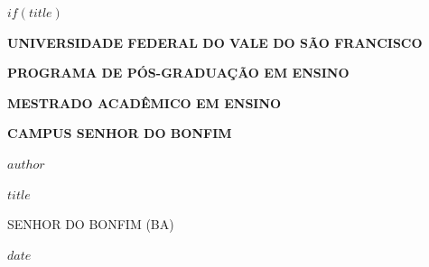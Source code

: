 $if(title)$
\begin{titlepage}
\thispagestyle{empty}
\begin{center}

{\MakeUppercase{\large\bfseries Universidade Federal do Vale do São Francisco}}

\vspace{1cm}

{\MakeUppercase{\large\bfseries Programa de Pós-Graduação em Ensino}}

\vspace{0.5cm}

{\MakeUppercase{\large\bfseries Mestrado Acadêmico em Ensino}}

\vspace{0.5cm}

{\MakeUppercase{\large\bfseries Campus Senhor do Bonfim}}

\vspace{3cm}

{\Large\bfseries\MakeUppercase{$author$}}

\vspace{5cm}

{\Large\bfseries\MakeUppercase{$title$}}

\vfill

{\large\MakeUppercase{Senhor do Bonfim (BA)}}

\vspace{0.5cm}

{\large $date$}

\end{center}
\end{titlepage}


